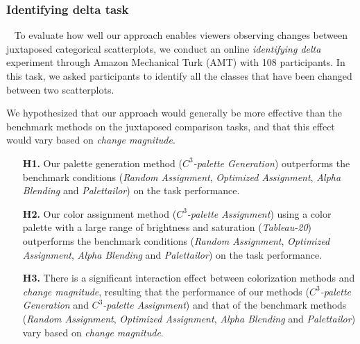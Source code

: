 {\subsubsection{Identifying delta task}
\
\newline
To evaluate how well our approach enables viewers observing changes between juxtaposed categorical scatterplots, we conduct an online \emph{identifying delta} experiment through Amazon Mechanical Turk (AMT) with 108 participants.
In this task, we asked participants to identify all the classes that have been changed between two scatterplots.

\vspace{.3em}
 We hypothesized that our approach would generally be more effective than the benchmark methods on the juxtaposed comparison tasks, and that this effect would vary based on \emph{change magnitude}.
\begin{itemize}[noitemsep]
\setlength{\itemsep}{5pt}
    \item[\textbf{H1.}] Our palette generation method (\emph{$C^3$-palette Generation}) outperforms the benchmark conditions (\emph{Random Assignment}, \emph{Optimized Assignment}, \emph{Alpha Blending} and \emph{Palettailor}) on the task performance.

    \item [\textbf{H2.}] Our color assignment method (\emph{$C^3$-palette Assignment}) using a color palette with a large range of brightness and saturation (\emph{Tableau-20}) outperforms the benchmark conditions (\emph{Random Assignment}, \emph{Optimized Assignment}, \emph{Alpha Blending} and \emph{Palettailor}) on the task performance.

    \item [\textbf{H3.}] There is a significant interaction effect between colorization methods and \emph{change magnitude}, resulting that the performance of our methods (\emph{$C^3$-palette Generation} and \emph{$C^3$-palette Assignment}) and that of the benchmark methods (\emph{Random Assignment}, \emph{Optimized Assignment}, \emph{Alpha Blending} and \emph{Palettailor}) vary based on \emph{change magnitude}.
\end{itemize}

}
